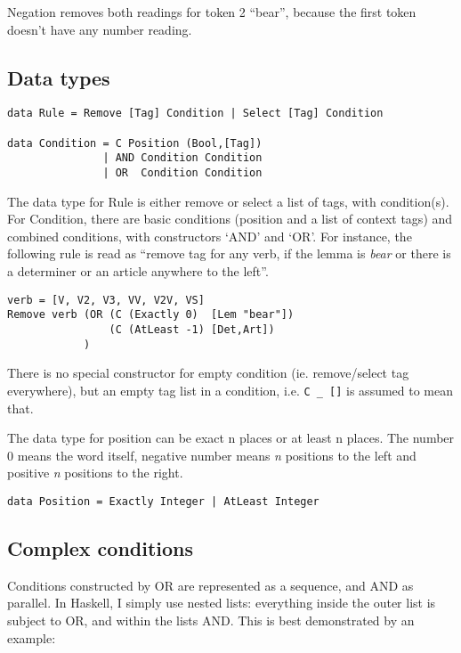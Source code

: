 \documentclass[a4paper, 11pt]{article}
\begin{document}
Negation removes both readings for token 2 ``bear'', because the first
token doesn't have any number reading.

\subsection{Data types}

\begin{lstlisting}
data Rule = Remove [Tag] Condition | Select [Tag] Condition

data Condition = C Position (Bool,[Tag])
               | AND Condition Condition
               | OR  Condition Condition 
\end{lstlisting}

The data type for Rule is either remove or select a list of tags, with condition(s).
For Condition, there are basic conditions (position and a list of context tags) and combined conditions, with constructors `AND' and `OR'. For instance, the following rule is read as ``remove tag for any verb, if the lemma is \emph{bear} or there is a determiner or an article anywhere to the left''.

\begin{lstlisting}
verb = [V, V2, V3, VV, V2V, VS]
Remove verb (OR (C (Exactly 0)  [Lem "bear"])
                (C (AtLeast -1) [Det,Art])
            )
\end{lstlisting}

There is no special constructor for empty condition (ie. remove/select tag everywhere), but an empty tag list in a condition, i.e. \texttt{C \_ []} is assumed to mean that.

The data type for position can be exact n places or at least n places. The number 0 means the word itself, negative number means \emph{n} positions to the left and positive \emph{n} positions to the right.

\begin{lstlisting}
data Position = Exactly Integer | AtLeast Integer
 \end{lstlisting}

\subsection{Complex conditions}
Conditions constructed by OR are represented as a sequence, and AND as
parallel. In Haskell, I simply use nested lists: everything inside the
outer list is subject to OR, and within the lists AND. This is best
demonstrated by an example:
\end{document}
